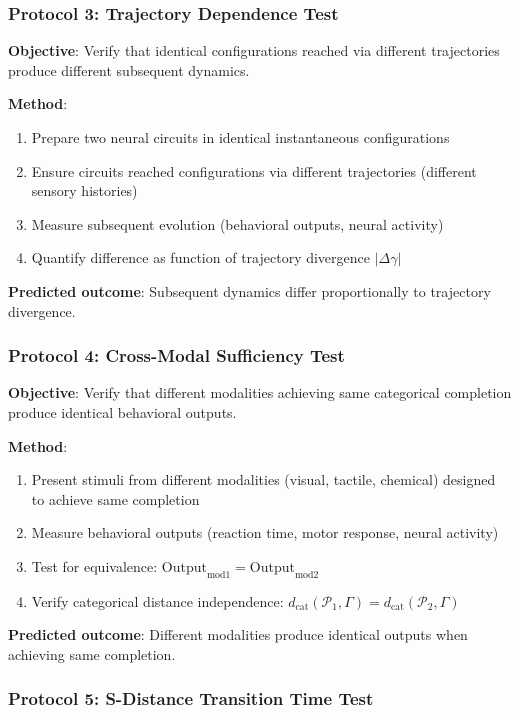 \documentclass[aps,prd,twocolumn,superscriptaddress,floatfix,nofootinbib]{revtex4-2}
\theoremstyle{remark}
\begin{document}
\subsubsection{Protocol 3: Trajectory Dependence Test}

\textbf{Objective}: Verify that identical configurations reached via different trajectories produce different subsequent dynamics.

\textbf{Method}:
\begin{enumerate}
\item Prepare two neural circuits in identical instantaneous configurations
\item Ensure circuits reached configurations via different trajectories (different sensory histories)
\item Measure subsequent evolution (behavioral outputs, neural activity)
\item Quantify difference as function of trajectory divergence $|\Delta \gamma|$
\end{enumerate}

\textbf{Predicted outcome}: Subsequent dynamics differ proportionally to trajectory divergence.

\subsubsection{Protocol 4: Cross-Modal Sufficiency Test}

\textbf{Objective}: Verify that different modalities achieving same categorical completion produce identical behavioral outputs.

\textbf{Method}:
\begin{enumerate}
\item Present stimuli from different modalities (visual, tactile, chemical) designed to achieve same completion
\item Measure behavioral outputs (reaction time, motor response, neural activity)
\item Test for equivalence: $\text{Output}_{\text{mod1}} = \text{Output}_{\text{mod2}}$
\item Verify categorical distance independence: $d_{\text{cat}}(\mathcal{P}_1, \Gamma) = d_{\text{cat}}(\mathcal{P}_2, \Gamma)$
\end{enumerate}

\textbf{Predicted outcome}: Different modalities produce identical outputs when achieving same completion.

\subsubsection{Protocol 5: S-Distance Transition Time Test}
\end{document}
